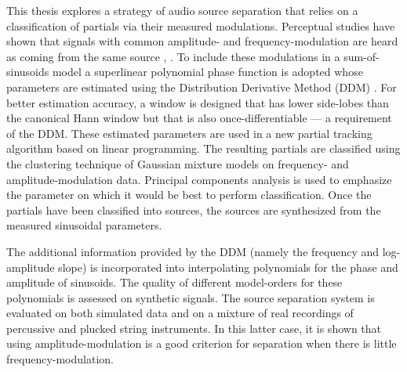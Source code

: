 This thesis explores a strategy of audio source separation that relies on a
classification of partials via their measured modulations. Perceptual studies
have shown that signals with common amplitude\hyp{} and
frequency\hyp{}modulation are heard as coming from the same source
\cite{mcadams1989segregation}, \cite{marin1991segregation}. To include these
modulations in a sum-of-sinusoids model a superlinear polynomial phase function
is adopted whose parameters are estimated using the Distribution Derivative
Method (DDM) \cite{betser2009sinusoidal}. For better estimation accuracy, a
window is designed that has lower side-lobes than the canonical Hann window but
that is also once-differentiable --- a requirement of the DDM. These estimated
parameters are used in a new partial tracking algorithm based on linear
programming. The resulting partials are classified using the clustering
technique of Gaussian mixture models \cite{friedman2001elements} on frequency-
and amplitude-modulation data. Principal components analysis is used to
emphasize the parameter on which it would be best to perform classification.
Once the partials have been classified into sources, the sources are synthesized
from the measured sinusoidal parameters.

The additional information provided by the DDM (namely the frequency and
log-amplitude slope) is incorporated into interpolating polynomials for the
phase and amplitude of sinusoids. The quality of different model-orders for
these polynomials is assessed on synthetic signals. The source separation system
is evaluated on both simulated data and on a mixture of real recordings of
percussive and plucked string instruments. In this latter case, it is shown that
using amplitude-modulation is a good criterion for separation when there is
little frequency-modulation.
